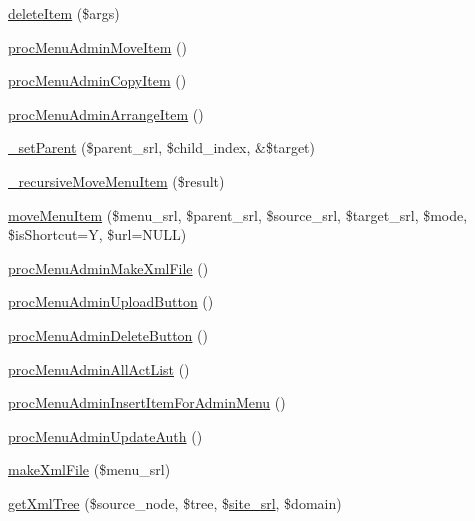\begin{DoxyCompactItemize}
\item 
\hyperlink{classmenuAdminController_a0a1051857eeec06de37b3d09729bd816}{delete\+Item} (\$args)
\item 
\hyperlink{classmenuAdminController_a4b1060e3cfddcffae2881a2981660b8b}{proc\+Menu\+Admin\+Move\+Item} ()
\item 
\hyperlink{classmenuAdminController_a57e5d3ee6747a38fd87eae506238e17f}{proc\+Menu\+Admin\+Copy\+Item} ()
\item 
\hyperlink{classmenuAdminController_ac803e1a5fb5bf35e30f20d727afb89dd}{proc\+Menu\+Admin\+Arrange\+Item} ()
\item 
\hyperlink{classmenuAdminController_a0eee3e8dfe3a4f9af9bd76f4776951cb}{\+\_\+set\+Parent} (\$parent\+\_\+srl, \$child\+\_\+index, \&\$target)
\item 
\hyperlink{classmenuAdminController_a663ff3838dde914ecaa1cd2875ce6848}{\+\_\+recursive\+Move\+Menu\+Item} (\$result)
\item 
\hyperlink{classmenuAdminController_af8dacd19919e854dbe083b602ea0f183}{move\+Menu\+Item} (\$menu\+\_\+srl, \$parent\+\_\+srl, \$source\+\_\+srl, \$target\+\_\+srl, \$mode, \$is\+Shortcut=\textquotesingle{}Y\textquotesingle{}, \$url=N\+U\+L\+L)
\item 
\hyperlink{classmenuAdminController_a8808afabf9eee859aca4150fc5d23051}{proc\+Menu\+Admin\+Make\+Xml\+File} ()
\item 
\hyperlink{classmenuAdminController_aa5f219cd08b79ff43eef69c89e7a9fd5}{proc\+Menu\+Admin\+Upload\+Button} ()
\item 
\hyperlink{classmenuAdminController_a8af649b53b356cc3b359253acd2183a2}{proc\+Menu\+Admin\+Delete\+Button} ()
\item 
\hyperlink{classmenuAdminController_a9a08d8c529270973c2dab9d62846b3b9}{proc\+Menu\+Admin\+All\+Act\+List} ()
\item 
\hyperlink{classmenuAdminController_a788f347d7232e73062a39785960a4f14}{proc\+Menu\+Admin\+Insert\+Item\+For\+Admin\+Menu} ()
\item 
\hyperlink{classmenuAdminController_aa7ae548464c3919b04a2153b6f9f2459}{proc\+Menu\+Admin\+Update\+Auth} ()
\item 
\hyperlink{classmenuAdminController_a1635d4c0dc3ace9e475422f9280e615e}{make\+Xml\+File} (\$menu\+\_\+srl)
\item 
\hyperlink{classmenuAdminController_ae924a4c2ac50c955e01e9c234d93c767}{get\+Xml\+Tree} (\$source\+\_\+node, \$tree, \$\hyperlink{ko_8install_8php_a8b1406b4ad1048041558dce6bfe89004}{site\+\_\+srl}, \$domain)

\end{DoxyCompactItemize}
